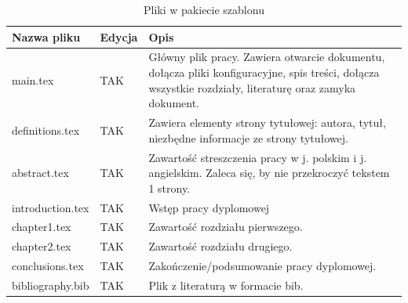 \begin{table}[h]
    \centering
    \caption{Pliki w pakiecie szablonu}
    \begin{tabular}{p{}|p{} | p{}}
        \toprule
        \textbf{Nazwa pliku} & \textbf{Edycja} & \textbf{Opis}                                                                                                                                                               \\
        \midrule
        main.tex             & TAK             & Główny plik pracy. Zawiera otwarcie dokumentu, dołącza pliki konfiguracyjne, spis treści, dołącza wszystkie rozdziały, literaturę oraz zamyka dokument.                     \\
        definitions.tex      & TAK             & Zawiera elementy strony tytułowej: autora, tytuł, niezbędne informacje ze strony tytułowej.                                                                                 \\
        abstract.tex         & TAK             & Zawartość streszczenia pracy w j. polskim i j. angielskim. Zaleca się, by nie przekroczyć tekstem 1 strony.                                                                 \\
        introduction.tex     & TAK             & Wstęp pracy dyplomowej                                                                                                                                                      \\
        chapter1.tex         & TAK             & Zawartość rozdziału pierwszego.                                                                                                                                             \\
        chapter2.tex         & TAK             & Zawartość rozdziału drugiego.                                                                                                                                               \\
        conclusions.tex      & TAK             & Zakończenie/podsumowanie pracy dyplomowej.                                                                                                                                  \\
        bibliography.bib     & TAK             & Plik z literaturą w formacie bib.                                                                                                                                           \\

\end{tabular}
\end{table}

